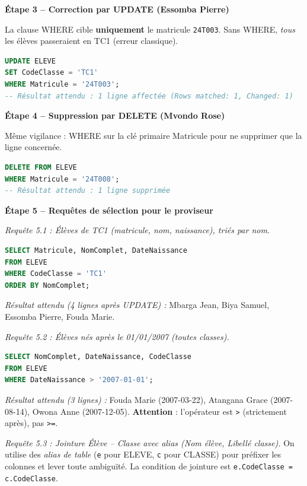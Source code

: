 \documentclass[11pt]{article}
\newcommand{\cle}[1]{{\popxbold\color{popdark}#1}}
\begin{document}
\begin{exoresolu}
\textbf{Étape 3 -- Correction par \cle{UPDATE} (Essomba Pierre)}\par
La clause \cle{WHERE} cible \textbf{uniquement} le matricule \texttt{24T003}. Sans \cle{WHERE}, \emph{tous} les élèves passeraient en TC1 (erreur classique).

\begin{lstlisting}[language=SQL]
UPDATE ELEVE
SET CodeClasse = 'TC1'
WHERE Matricule = '24T003';
-- Résultat attendu : 1 ligne affectée (Rows matched: 1, Changed: 1)
\end{lstlisting}

\textbf{Étape 4 -- Suppression par \cle{DELETE} (Mvondo Rose)}\par
Même vigilance : \cle{WHERE} sur la clé primaire \cle{Matricule} pour ne supprimer que la ligne concernée.

\begin{lstlisting}[language=SQL]
DELETE FROM ELEVE
WHERE Matricule = '24T008';
-- Résultat attendu : 1 ligne supprimée
\end{lstlisting}

\textbf{Étape 5 -- Requêtes de sélection pour le proviseur}\par

\noindent\textit{Requête 5.1 : Élèves de TC1 (matricule, nom, naissance), triés par nom.}
\begin{lstlisting}[language=SQL]
SELECT Matricule, NomComplet, DateNaissance
FROM ELEVE
WHERE CodeClasse = 'TC1'
ORDER BY NomComplet;
\end{lstlisting}
\emph{Résultat attendu (4 lignes après UPDATE) :} Mbarga Jean, Biya Samuel, Essomba Pierre, Fouda Marie.

\medskip
\noindent\textit{Requête 5.2 : Élèves nés après le 01/01/2007 (toutes classes).}
\begin{lstlisting}[language=SQL]
SELECT NomComplet, DateNaissance, CodeClasse
FROM ELEVE
WHERE DateNaissance > '2007-01-01';
\end{lstlisting}
\emph{Résultat attendu (3 lignes) :} Fouda Marie (2007-03-22), Atangana Grace (2007-08-14), Owona Anne (2007-12-05). \textbf{Attention} : l'opérateur est \texttt{>} (strictement après), pas \texttt{>=}.

\medskip
\noindent\textit{Requête 5.3 : Jointure Élève -- Classe avec alias (Nom élève, Libellé classe).}
On utilise des \emph{alias de table} (\texttt{e} pour \cle{ELEVE}, \texttt{c} pour \cle{CLASSE}) pour préfixer les colonnes et lever toute ambiguïté. La condition de jointure est \texttt{e.CodeClasse = c.CodeClasse}.


\end{exoresolu}
\end{document}
